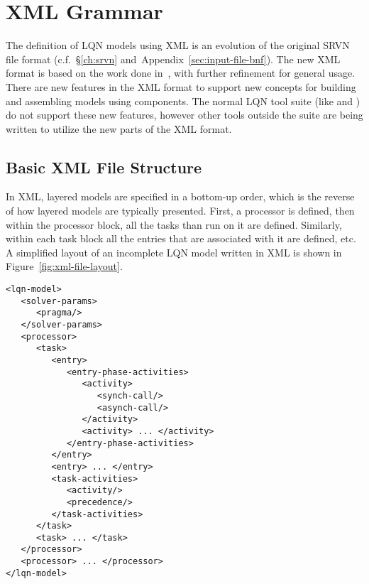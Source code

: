 
\chapter{XML Grammar}
\label{sec:xml-grammar}

The definition of LQN models using XML is an evolution of
the original SRVN file format (c.f.~\S\ref{ch:srvn} and~Appendix~\ref{sec:input-file-bnf}).  The
new XML format is based on the work done in~\cite{perf:wu-2003}, with
further refinement for general usage.  There are new features in the
XML format to support new concepts for building and assembling models
using components.  The normal LQN tool suite (like
 and ) do not support these new
features, however other tools outside the suite are being written to
utilize the new parts of the XML format.

\section{Basic XML File Structure}
\label{sec:xml-file-structure}

In XML, layered models are specified in a bottom-up order, which is
the reverse of how layered models are typically presented.  First, a
processor is defined, then within the processor block, all the tasks
than run on it are defined.  Similarly, within each task block all the
entries that are associated with it are defined, etc.  A simplified
layout of an incomplete LQN model written in XML is shown in
Figure~\ref{fig:xml-file-layout}.

\lstset{language=XML,basicstyle=\ttfamily,numbersep=10pt}
\begin{lstlisting}[float,caption={XML file layout.},label=fig:xml-file-layout]
<lqn-model>
   <solver-params>
      <pragma/>
   </solver-params>
   <processor>
      <task>
         <entry>
            <entry-phase-activities>
               <activity>
                  <synch-call/>
                  <asynch-call/>
               </activity>
               <activity> ... </activity>
            </entry-phase-activities>
         </entry>
         <entry> ... </entry>
         <task-activities>
            <activity/>
            <precedence/>
         </task-activities>
      </task>
      <task> ... </task>
   </processor>
   <processor> ... </processor>
</lqn-model>
\end{lstlisting}

